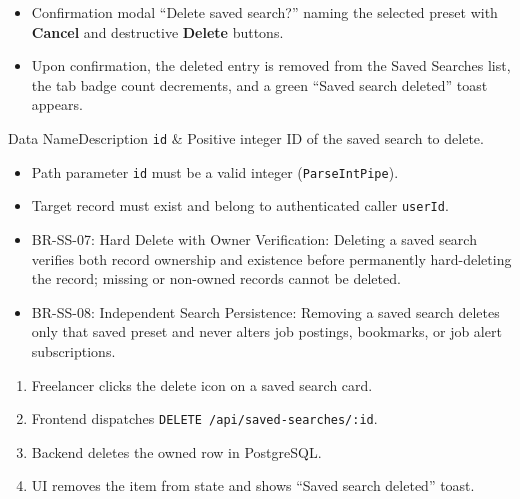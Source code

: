 \begin{itemize}[leftmargin=1.6em,topsep=3pt,itemsep=2pt,parsep=0pt,label=$\bullet$]
    \item Confirmation modal ``Delete saved search?'' naming the selected preset with \textbf{Cancel} and destructive \textbf{Delete} buttons.
    \item Upon confirmation, the deleted entry is removed from the Saved Searches list, the tab badge count decrements, and a green ``Saved search deleted'' toast appears.
\end{itemize}


\begin{specdatatable}{Data Name}{Description}
\texttt{id} & Positive integer ID of the saved search to delete.\\ \hline
\end{specdatatable}

\begin{itemize}[leftmargin=1.6em,topsep=3pt,itemsep=2pt,parsep=0pt,label=$\bullet$]
    \item Path parameter \texttt{id} must be a valid integer (\texttt{ParseIntPipe}).
    \item Target record must exist and belong to authenticated caller \texttt{userId}.
\end{itemize}

\begin{itemize}[leftmargin=1.6em,topsep=3pt,itemsep=2pt,parsep=0pt,label=$\bullet$]\brrulelist
    \item BR-SS-07: Hard Delete with Owner Verification: Deleting a saved search verifies both record ownership and existence before permanently hard-deleting the record; missing or non-owned records cannot be deleted.
    \item BR-SS-08: Independent Search Persistence: Removing a saved search deletes only that saved preset and never alters job postings, bookmarks, or job alert subscriptions.
\end{itemize}

\begin{enumerate}[leftmargin=1.8em,topsep=3pt,itemsep=2pt,parsep=0pt]
    \item Freelancer clicks the delete icon on a saved search card.
    \item Frontend dispatches \texttt{DELETE /api/saved-searches/:id}.
    \item Backend deletes the owned row in PostgreSQL.
    \item UI removes the item from state and shows ``Saved search deleted'' toast.
\end{enumerate}

